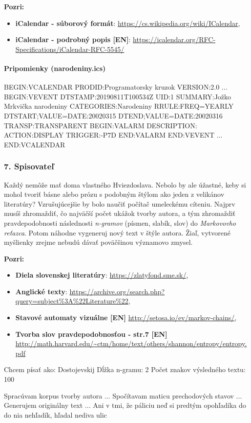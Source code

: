 \textbf{Pozri:}
\begin{itemize}
\itemsep0pt
\item \textbf{iCalendar - súborový formát}: \url{https://cs.wikipedia.org/wiki/ICalendar}, 
\item \textbf{iCalendar - podrobný popis [EN]}: \url{https://icalendar.org/RFC-Specifications/iCalendar-RFC-5545/}
\end{itemize}
 

\paragraph{Pripomienky (narodeniny.ics)}
\begin{code}
BEGIN:VCALENDAR
PRODID:Programatorsky kruzok
VERSION:2.0
...
BEGIN:VEVENT
DTSTAMP:20190811T100534Z
UID:1
SUMMARY:Jožko Mrkvička narodeniny
CATEGORIES:Narodeniny
RRULE:FREQ=YEARLY
DTSTART;VALUE=DATE:20020315
DTEND;VALUE=DATE:20020316
TRANSP:TRANSPARENT
BEGIN:VALARM
DESCRIPTION:
ACTION:DISPLAY
TRIGGER:-P7D
END:VALARM
END:VEVENT
...
END:VCALENDAR
\end{code}

\subsubsection*{7. Spisovateľ}
Každý nemôže mať doma vlastného Hviezdoslava. Nebolo by ale úžastné, keby si mohol tvoriť básne alebo prózu s podobným štýlom ako jeden z velikánov literatúry? Vzrušujúcejšie by bolo naučiť počítač umeleckému cíteniu. Najprv musíš zhromaždiť, čo najväčší počet ukážok tvorby autora, a tým zhromaždiť pravdepodobnosti následnosti \textit{n-gramov} (písmen, slabík, slov) do \textit{Markovovho reťazca}. Potom náhodne vygeneruj nový text v štýle autora. Žiaľ, vytvorené myšlienky zrejme nebudú dávať poväčšinou významovo zmysel.

\textbf{Pozri:}
\begin{itemize}
\itemsep0pt
\item \textbf{Diela slovenskej literatúry}: \url{https://zlatyfond.sme.sk/}, 
\item \textbf{Anglické texty}: \url{https://archive.org/search.php?query=subject%3A%22Literature%22}, 
\item \textbf{Stavové automaty vizuálne [EN]} \url{http://setosa.io/ev/markov-chains/}, 
\item \textbf{Tvorba slov pravdepodobnosťou - str.7 [EN]} \url{http://math.harvard.edu/~ctm/home/text/others/shannon/entropy/entropy.pdf}
\end{itemize}

\begin{code}
Chcem písať ako: Dostojevskij
Dĺžka n-gramu: 2
Počet znakov výsledného textu: 100

Spracúvam korpus tvorby autora ...
Spočítavam maticu prechodových stavov ...
Generujem originálny text ...
Ani v tmi, že páliciu neď si predtým opohľadíka do do nia nehľadík, hľadal nediva ulic
\end{code} 
